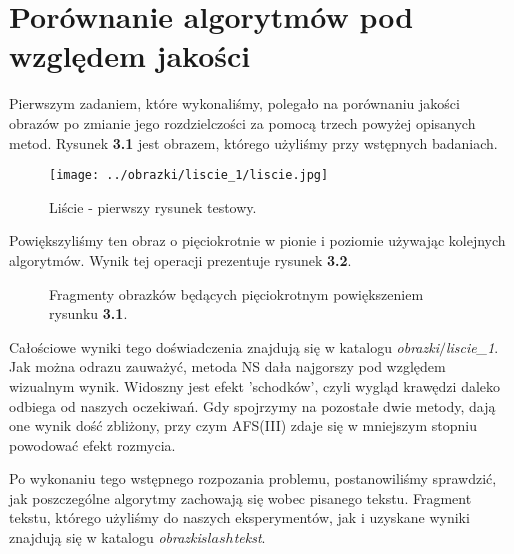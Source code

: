 \section{Porównanie algorytmów pod względem jakości}
Pierwszym zadaniem, które wykonaliśmy, polegało na porównaniu jakości obrazów po
zmianie jego rozdzielczości za pomocą trzech powyżej opisanych metod. Rysunek
\textbf{3.1} jest obrazem, którego użyliśmy przy wstępnych badaniach.
\begin{figure}[h!tb]
\begin{center}
\texttt{[image: ../obrazki/liscie\_1/liscie.jpg]}
\caption{Liście - pierwszy rysunek testowy.}
\end{center}
\end{figure}

Powiększyliśmy ten obraz o pięciokrotnie w pionie i poziomie używając
kolejnych algorytmów. Wynik tej operacji prezentuje rysunek \textbf{3.2}.
\begin{figure}[h!tb]
\begin{center}
\caption{Fragmenty obrazków będących pięciokrotnym powiększeniem rysunku \textbf{3.1}.}
\end{center}
\end{figure}

Całościowe wyniki tego doświadczenia znajdują się w katalogu \textit{obrazki$\slash$liscie\_1}. Jak można odrazu zauważyć, metoda NS dała najgorszy pod względem wizualnym wynik.
Widoszny jest efekt 'schodków', czyli wygląd krawędzi daleko odbiega od naszych
oczekiwań. Gdy spojrzymy na pozostałe dwie metody, dają one wynik dość zbliżony,
przy czym AFS(III) zdaje się w mniejszym stopniu powodować efekt rozmycia.

Po wykonaniu tego wstępnego rozpozania problemu, postanowiliśmy sprawdzić, jak
poszczególne algorytmy zachowają się wobec pisanego tekstu.
Fragment tekstu, którego użyliśmy do naszych eksperymentów, jak i uzyskane wyniki znajdują się w katalogu \textit{obrazki$slash$tekst}.

